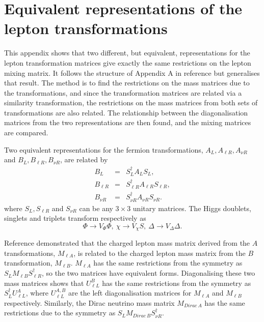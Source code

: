 \documentclass[nofootinbib,showpacs]{revtex4}
\begin{document}
\section{Equivalent representations of the lepton transformations}\label{app}

This appendix shows that two different, but equivalent, representations for the lepton transformation matrices give exactly the same restrictions on the lepton mixing matrix. It follows the structure of Appendix A in reference \cite{nogo2} but generalises that result. The method is to find the restrictions on the mass matrices due to the transformations, and since the transformation matrices are related via a similarity transformation, the restrictions on the mass matrices from both sets of transformations are also related. The relationship between the diagonalisation matrices from the two representations are then found, and the mixing matrices are compared.

Two equivalent representations for the fermion transformations, $A_L,A_{\ell R},A_{\nu R}$ and $B_L,B_{\ell R},B_{\nu R}$, are related by 
\begin{eqnarray}
B_L&=&S_L^\dagger A_L S_L, \\
B_{\ell R}&=&S_{\ell R}^\dagger A_{\ell R} S_{\ell R},\\
B_{\nu R}&=&S_{\nu R}^\dagger A_{\nu R} S_{\nu R}.
\end{eqnarray}
where $S_L,S_{\ell R}$ and $S_{\nu R}$ can be any $3\times 3$ unitary matrices. 
The Higgs doublets, singlets and triplets transform respectively as
\begin{equation}
\Phi \rightarrow V_\Phi \Phi, \: \chi \rightarrow V_\chi S, \: \Delta \rightarrow V_\Delta \Delta .
\end{equation}

Reference \cite{nogo2} demonstrated that the charged lepton mass matrix derived from the $A$ transformations, $M_{\ell A}$, is related to the charged lepton mass matrix from the $B$ transformation, $M_{\ell B}$. $M_{\ell A}$ has the same restrictions from the symmetry as $S_L M_{\ell B} S_{\ell R}^\dagger$, so the two matrices have equivalent forms. Diagonalising these two mass matrices shows that $U_{\ell L}^B$ has the same restrictions from the symmetry as $S_L^\dagger U_{\ell L}^A$, where  $U_{\ell L}^{A,B}$ are the left diagonalisation matrices for $M_{\ell A}$ and $M_{\ell B}$ respectively.
Similarly, the Dirac neutrino mass matrix $M_{Dirac\: A}$ has the same restrictions due to the symmetry as $S_L M_{Dirac\: B} S_{\nu R}^\dagger$. 
\end{document}
